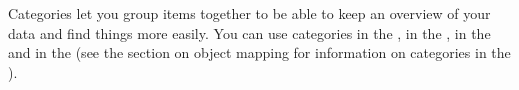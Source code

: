Categories let you  group items together to be able to keep an overview of your data and find things more easily. You can use categories in the \gdtestcasebrowser{}, in the \gdtestsuitebrowser{}, in the \gddataeditor{} and in the  \gdomeditor{} (see the section on object mapping for information on categories in the \gdomeditor{} ). 
